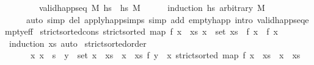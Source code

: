 \begin{isabellebody}
\ \ \ \ \ \ \ \ valid{\isacharunderscore}{\kern0pt}happ{\isacharunderscore}{\kern0pt}seq\ M\ {\isacharparenleft}{\kern0pt}hs{}\ {\isacharat}{\kern0pt}\ hs{}{\isacharparenright}{\kern0pt}\ M{\isacharprime}{\kern0pt}{\isachardoublequoteclose}\ \ \isanewline
%
\isadelimproof
\ \ %
\endisadelimproof
%
\isatagproof
{}\isamarkupfalse%
\ {\isacharparenleft}{\kern0pt}induction\ hs{}\ arbitrary{\isacharcolon}{\kern0pt}\ M{\isacharparenright}{\kern0pt}\isanewline
\ \ \ \ \ {\isacharparenleft}{\kern0pt}auto\ simp\ del{\isacharcolon}{\kern0pt}\ apply{\isacharunderscore}{\kern0pt}happ{\isachardot}{\kern0pt}simps\ simp\ add{\isacharcolon}{\kern0pt}\ empty{\isacharunderscore}{\kern0pt}happ\ intro{\isacharbang}{\kern0pt}{\isacharcolon}{\kern0pt}\ valid{\isacharunderscore}{\kern0pt}happ{\isacharunderscore}{\kern0pt}seq{\isacharunderscore}{\kern0pt}empty{\isacharunderscore}{\kern0pt}eff{\isacharparenright}{\kern0pt}%
\endisatagproof
{\isafoldproof}%
%
\isadelimproof
\isanewline
%
\endisadelimproof
\isanewline
{}\isamarkupfalse%
\ strict{\isacharunderscore}{\kern0pt}sorted{\isacharunderscore}{\kern0pt}cons{\isacharcolon}{\kern0pt}\ {\isachardoublequoteopen}{\isasymlbrakk}strict{\isacharunderscore}{\kern0pt}sorted\ {\isacharparenleft}{\kern0pt}map\ f\ {\isacharparenleft}{\kern0pt}x\ {\isacharhash}{\kern0pt}\ xs{\isacharparenright}{\kern0pt}{\isacharparenright}{\kern0pt}{\isacharsemicolon}{\kern0pt}\ x{\isacharprime}{\kern0pt}\ {\isasymin}\ set\ xs{\isasymrbrakk}\ {\isasymLongrightarrow}\ f\ x\ {\isasymnoteq}\ f\ x{\isacharprime}{\kern0pt}{\isachardoublequoteclose}\isanewline
%
\isadelimproof
\ \ %
\endisadelimproof
%
\isatagproof
{}\isamarkupfalse%
\ {\isacharparenleft}{\kern0pt}induction\ xs{\isacharparenright}{\kern0pt}\ auto%
\endisatagproof
{\isafoldproof}%
%
\isadelimproof
\isanewline
%
\endisadelimproof
\isanewline
{}\isamarkupfalse%
\ strict{\isacharunderscore}{\kern0pt}sorted{\isacharunderscore}{\kern0pt}order{\isacharcolon}{\kern0pt}\isanewline
\ \ \ \ \ \ {\isachardoublequoteopen}{\isasymlbrakk}{\isacharparenleft}{\kern0pt}{\isasymAnd}x{\isachardot}{\kern0pt}\ x\ {\isasymin}\ s\ {\isasymLongrightarrow}\ {\isasymexists}y\ {\isasymin}\ set\ {\isacharparenleft}{\kern0pt}x{}\ {\isacharhash}{\kern0pt}\ xs{}\ {\isacharat}{\kern0pt}\ x{}\ {\isacharhash}{\kern0pt}\ xs{}{\isacharparenright}{\kern0pt}{\isachardot}{\kern0pt}\ f\ y\ {\isacharequal}{\kern0pt}\ x{\isacharparenright}{\kern0pt}{\isacharsemicolon}{\kern0pt}\ strict{\isacharunderscore}{\kern0pt}sorted\ {\isacharparenleft}{\kern0pt}map\ f\ {\isacharparenleft}{\kern0pt}x{}\ {\isacharhash}{\kern0pt}\ xs{}\ {\isacharat}{\kern0pt}\ x{}\ {\isacharhash}{\kern0pt}\ xs{}{\isacharparenright}{\kern0pt}{\isacharparenright}{\kern0pt}{\isacharsemicolon}{\kern0pt}\isanewline

\end{isabellebody}
